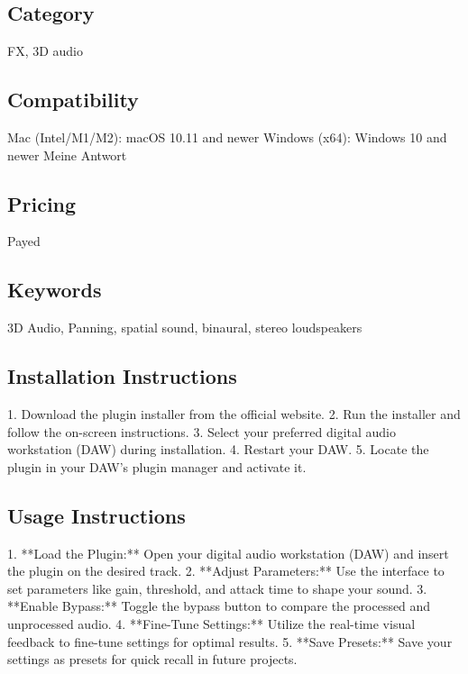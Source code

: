 \documentclass[8pt]{article}
\begin{document}
    \subsection*{Category}
    FX, 3D audio

    \subsection*{Compatibility}
    Mac (Intel/M1/M2): macOS 10.11 and newer
Windows (x64): Windows 10 and newer
Meine Antwort



    \subsection*{Pricing}
    Payed

    \subsection*{Keywords}
    3D Audio, Panning, spatial sound, binaural, stereo loudspeakers

    \subsection*{Installation Instructions}
    1. Download the plugin installer from the official website.
2. Run the installer and follow the on-screen instructions.
3. Select your preferred digital audio workstation (DAW) during installation.
4. Restart your DAW.
5. Locate the plugin in your DAW’s plugin manager and activate it.

    \subsection*{Usage Instructions}
    1. **Load the Plugin:** Open your digital audio workstation (DAW) and insert the plugin on the desired track.
2. **Adjust Parameters:** Use the interface to set parameters like gain, threshold, and attack time to shape your sound.
3. **Enable Bypass:** Toggle the bypass button to compare the processed and unprocessed audio.
4. **Fine-Tune Settings:** Utilize the real-time visual feedback to fine-tune settings for optimal results.
5. **Save Presets:** Save your settings as presets for quick recall in future projects.
\end{document}
